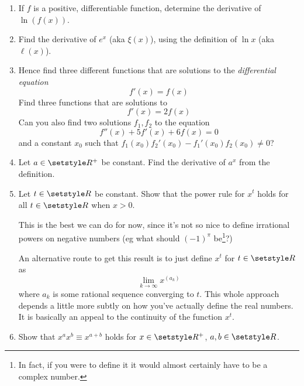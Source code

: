 \begin{enumerate}
  If we \emph{define}\footnote{
   One should stress again that this is not the only definition of \(e\)
   (although any correct alternative definition should imply that this one is
   also true)
  } \(e \defeq \xi(1)\), then
  \(e^x \equiv \xi(x \cdot \ell(\xi(1))) \equiv \xi(x)\). So in fact \(\xi\) has
  been the famous ``exponential function'' all this time! This is one of the
  reasons that the number \(e\) is significant. From now on I will write \(e^x\)
  or \(\exp x\) instead of \(\xi(x)\), and \(\ln x\) or
  \(\log x\)\footnote{
   standing for ``natural logarithm'' (logarithmus naturalis) and ``logarithm'',
   respectively.
  }
  instead of \(\ell(x)\).
 \item
  If \(f\) is a positive, differentiable function, determine the derivative of
  \(\ln(f(x))\).
 \item
  Find the derivative of \(e^x\) (aka \(\xi(x)\)), using the definition of
  \(\ln x\) (aka \(\ell(x)\)).
 \item
  Hence find three different functions that are solutions to the
  \emph{differential equation}
  \begin{equation*}
   f'(x) = f(x)
  \end{equation*}
  Find three functions that are solutions to
  \begin{equation*}
   f'(x) = 2f(x)
  \end{equation*}
  Can you also find two solutions \(f_1, f_2\) to the equation
  \begin{equation*}
   f''(x) + 5f'(x) + 6f(x) = 0
  \end{equation*}
  and a constant \(x_0\) such that
  \(f_1(x_0) f_2'(x_0) - f_1'(x_0) f_2(x_0) \ne 0\)?
 \item
  Let \(a \in \Reals^+\) be constant. Find the derivative of \(a^x\) from the
  definition.
 \item
  Let \(t \in \Reals\) be constant. Show that the power rule for \(x^t\) holds
  for all \(t \in \Reals\) when \(x > 0\).

  This is the best we can do for now, since it's not so nice to define
  irrational powers on negative numbers (eg what should \((-1)^\pi\)
  be\footnote{
   In fact, if you were to define it it would almost certainly have to be a
   complex number.
  }?)

  An alternative route to get this result is to just define
  \(x^t\) for \(t \in \Reals\) as
  \begin{equation*}
   \lim_{k \to \infty} x^{(a_k)}
  \end{equation*}
  where \(a_k\) is some rational sequence converging to \(t\). This whole
  approach depends a little more subtly on how you've actually define the real
  numbers. It is basically an appeal to the continuity of the function
  \(x^t\).
 \item
  Show that \(x^a x^b \equiv x^{a + b}\) holds for \(x \in \Reals^+\),
  \(a, b \in \Reals\).


\end{enumerate}

